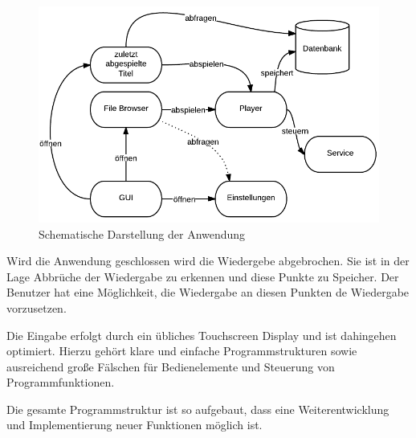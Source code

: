 \begin{figure}
\begin{center}
\includegraphics[scale=0.6]{images/konzept}
\caption{Schematische Darstellung der Anwendung}
\label{konzept}
\end{center}
\end{figure}

Wird die Anwendung geschlossen wird die Wiedergebe abgebrochen. Sie ist in der Lage Abbrüche der Wiedergabe zu erkennen und diese Punkte zu Speicher. Der Benutzer hat eine Möglichkeit, die Wiedergabe an diesen Punkten de Wiedergabe vorzusetzen.

Die Eingabe erfolgt durch ein übliches Touchscreen Display und ist dahingehen optimiert. Hierzu gehört klare und einfache Programmstrukturen sowie ausreichend große Fälschen für Bedienelemente und Steuerung von Programmfunktionen.

Die gesamte Programmstruktur ist so aufgebaut, dass eine Weiterentwicklung und Implementierung neuer Funktionen möglich ist.